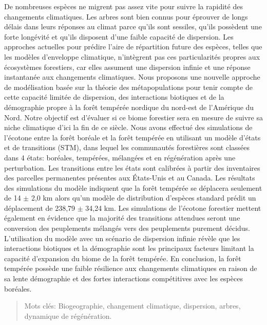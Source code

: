 \resume
\begin{singlespace}

  De nombreuses espèces ne migrent pas assez vite pour suivre la rapidité des changements climatiques. Les arbres sont bien connus pour éprouver de longs délais dans leurs réponses au climat parce qu'ils sont sessiles, qu'ils possèdent une forte longévité et qu'ils disposent d'une faible capacité de dispersion. Les approches actuelles pour prédire l'aire de répartition future des espèces, telles que les modèles d'enveloppe climatique, n'intègrent pas ces particularités propres aux écosystèmes forestiers, car elles assument une dispersion infinie et une réponse instantanée aux changements climatiques. Nous proposons une nouvelle approche de modélisation basée sur la théorie des métapopulations pour tenir compte de cette capacité limitée de dispersion, des interactions biotiques et de la démographie propre à la forêt tempérée nordique du nord-est de l'Amérique du Nord. Notre objectif est d'évaluer si ce biome forestier sera en mesure de suivre sa niche climatique d'ici la fin de ce siècle. Nous avons effectué des simulations de l'écotone entre la forêt boréale et la forêt tempérée en utilisant un modèle d'états et de transitions (STM), dans lequel les communautés forestières sont classées dans 4 états: boréales, tempérées, mélangées et en régénération après une perturbation. Les transitions entre les états sont calibrées à partir des inventaires des parcelles permanentes présentes aux États-Unis et au Canada. Les résultats des simulations du modèle indiquent que la forêt tempérée se déplacera seulement de 14 $\pm$ 2,0 km alors qu'un modèle de distribution d'espèces standard prédit un déplacement de 238,79 $\pm$ 34,24 km. Les simulations de l'écotone forestier mettent également en évidence que la majorité des transitions attendues seront une conversion des peuplements mélangés vers des peuplements purement décidus. L'utilisation du modèle avec un scénario de dispersion infinie révèle que les interactions biotiques et la démographie sont les principaux facteurs limitant la capacité d'expansion du biome de la forêt tempérée. En conclusion, la forêt tempérée possède une faible résilience aux changements climatiques en raison de sa lente démographie et des fortes interactions compétitives avec les espèces boréales.

  \begin{quote}
    Mots clés: Biogeographie, changement climatique, dispersion, arbres, dynamique de régénération.
  \end{quote}
\end{singlespace}
\cleardoublepage

